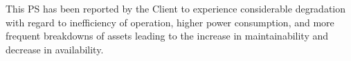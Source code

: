 
This PS has been reported by the Client to experience considerable degradation with regard to inefficiency of operation, higher power consumption, and more frequent breakdowns of assets leading to the increase in maintainability and decrease in availability. 

